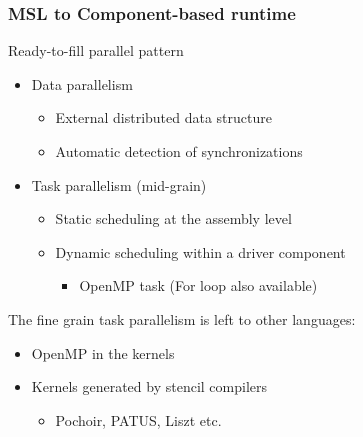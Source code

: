 \documentclass{beamer}
\begin{document}
\begin{frame}
\frametitle{MSL to Component-based runtime}
\begin{block}{Ready-to-fill parallel pattern}
\begin{itemize}
\item Data parallelism
\begin{itemize}
\item External distributed data structure
\item Automatic detection of synchronizations
\end{itemize}
\item Task parallelism (mid-grain)
\begin{itemize}
\item Static scheduling at the assembly level 
\item Dynamic scheduling within a driver component
  \begin{itemize}
  \item OpenMP task (For loop also available)
  \end{itemize}
\end{itemize}
\end{itemize}
\end{block}
The fine grain task parallelism is left to other languages: 
\begin{itemize}
\item OpenMP in the kernels
\item Kernels generated by stencil compilers
  \begin{itemize}
  \item Pochoir, PATUS, Liszt etc.
  \end{itemize}
\end{itemize}
\end{frame}
\end{document}
